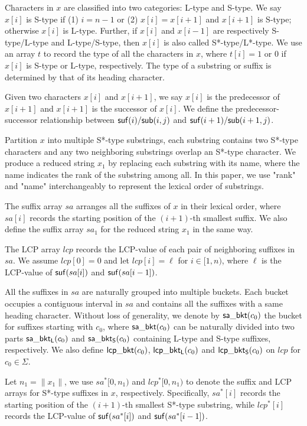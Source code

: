 \documentclass[10pt,journal,compsoc]{IEEEtran}
\begin{document}
Characters in $x$ are classified into two categories: L-type and S-type. We say $x[i]$ is S-type if (1) $i = n - 1$ or (2) $x[i] = x[i + 1]$ and $x[i + 1]$ is S-type; otherwise $x[i]$ is L-type. Further, if $x[i]$ and $x[i - 1]$ are respectively S-type/L-type and L-type/S-type, then $x[i]$ is also called S*-type/L*-type. We use an array $t$ to record the type of all the characters in $x$, where $t[i] = 1$ or $0$ if $x[i]$ is S-type or L-type, respectively. The type of a substring or suffix is determined by that of its heading character.

Given two characters $x[i]$ and $x[i + 1]$, we say $x[i]$ is the predecessor of $x[i + 1]$ and $x[i + 1]$ is the successor of $x[i]$. We define the predecessor-successor relationship between ${\sf suf}(i)/{\sf sub}(i, j)$ and ${\sf suf}(i + 1)/{\sf sub}(i + 1, j)$.

Partition $x$ into multiple S*-type substrings, each substring contains two S*-type characters and any two neighboring substrings overlap an S*-type character. We produce a reduced string $x_1$ by replacing each substring with its name, where the name indicates the rank of the	 substring among all. In this paper, we use "rank" and "name" interchangeably to represent the lexical order of substrings. 

The suffix array $sa$ arranges all the suffixes of $x$ in their lexical order, where $sa[i]$ records the starting position of the $(i + 1)$-th smallest suffix. We also define the suffix array $sa_1$ for the reduced string $x_1$ in the same way.

The LCP array $lcp$ records the LCP-value of each pair of neighboring suffixes in $sa$. We assume $lcp[0] = 0$ and let $lcp[i] = \ell$ for $i \in [1, n)$, where $\ell$ is the LCP-value of ${\sf suf}(sa[i])$ and ${\sf suf}(sa[i - 1])$.

All the suffixes in $sa$ are naturally grouped into multiple buckets. Each bucket occupies a contiguous interval in $sa$ and contains all the suffixes with a same heading character. Without loss of generality, we denote by ${\sf sa\_bkt}(c_0)$ the bucket for suffixes starting with $c_0$, where ${\sf sa\_bkt}(c_0)$ can be naturally divided into two parts ${\sf sa\_bkt_L}(c_0)$ and ${\sf sa\_bkt_S}(c_0)$ containing L-type and S-type suffixes, respectively. We also define ${\sf lcp\_bkt}(c_0)$, ${\sf lcp\_bkt_L}(c_0)$ and ${\sf lcp\_bkt_S}(c_0)$ on $lcp$ for $c_0 \in \Sigma$.

Let $n_1 = \|x_1\|$, we use $sa^*[0, n_1)$ and $lcp^*[0, n_1)$ to denote the suffix and LCP arrays for S*-type suffixes in $x$, respectively. Specifically, $sa^*[i]$ records the starting position of the $(i + 1)$-th smallest S*-type substring, while $lcp^*[i]$ records the LCP-value of ${\sf suf}(sa^*[i])$ and ${\sf suf}(sa^*[i - 1])$.
\end{document}
